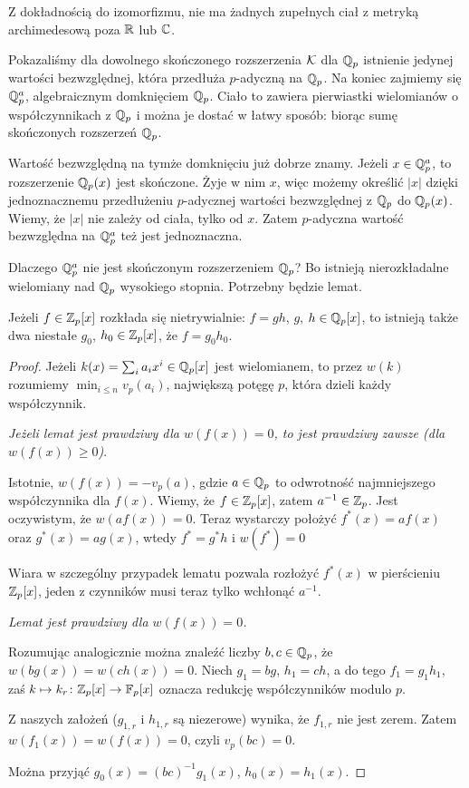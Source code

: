 \begin{fakt}
	Z dokładnością do izomorfizmu, nie ma żadnych zupełnych ciał z metryką archimedesową poza $\mathbb R$ lub $\mathbb C$.
\end{fakt}

Pokazaliśmy dla dowolnego skończonego rozszerzenia $\mathcal K$ dla $\mathbb Q_p$ istnienie jedynej wartości bezwzględnej, która przedłuża $p$-adyczną na $\mathbb Q_p$.
Na koniec zajmiemy się $\mathbb Q_p^a$, algebraicznym domknięciem $\mathbb Q_p$.
Ciało to zawiera pierwiastki wielomianów o współczynnikach z $\mathbb Q_p$ i można je dostać w łatwy sposób: biorąc sumę skończonych rozszerzeń $\mathbb Q_p$.

Wartość bezwzględną na tymże domknięciu już dobrze znamy.
Jeżeli $x \in \mathbb Q_p^a$, to rozszerzenie $\mathbb Q_p(x)$ jest skończone.
Żyje w nim $x$, więc możemy określić $|x|$ dzięki jednoznacznemu przedłużeniu $p$-adycznej wartości bezwzględnej z $\mathbb Q_p$ do $\mathbb Q_p(x)$.
Wiemy, że $|x|$ nie zależy od ciała, tylko od $x$.
Zatem $p$-adyczna wartość bezwzględna na $\mathbb Q_p^a$ też jest jednoznaczna.

Dlaczego $\mathbb Q_p^a$ nie jest skończonym rozszerzeniem $\mathbb Q_p$?
Bo istnieją nierozkładalne wielomiany nad $\mathbb Q_p$ wysokiego stopnia.
Potrzebny będzie lemat.

\begin{lemat}
	Jeżeli $f \in \mathbb Z_p[x]$ rozkłada się nietrywialnie: $f = gh$, $g$, $h \in \mathbb Q_p[x]$, to istnieją także dwa niestałe $g_0$, $h_0 \in \mathbb Z_p[x]$, że $f = g_0 h_0$.
\end{lemat}

\begin{proof}
	Jeżeli $k(x) = \sum_i a_i x^i \in \mathbb Q_p[x]$ jest wielomianem, to przez $w(k)$ rozumiemy $\min_{i \le n} v_p(a_i)$, największą potęgę $p$, która dzieli każdy współczynnik.

	\emph{Jeżeli lemat jest prawdziwy dla $w(f(x)) = 0$, to jest prawdziwy zawsze (dla $w(f(x)) \ge 0$)}.

	Istotnie, $w(f(x)) = - v_p(a)$, gdzie $a \in \mathbb Q_p$ to odwrotność najmniejszego współczynnika dla $f(x)$.
	Wiemy, że $f \in \mathbb Z_p[x]$, zatem $a^{-1} \in \mathbb Z_p$.
	Jest oczywistym, że $w(af(x)) = 0$.
	Teraz wystarczy położyć $f^*(x) = af(x)$ oraz $g^*(x) = ag(x)$, wtedy $f^* = g^*h$ i $w(f^*) =0$

	Wiara w szczególny przypadek lematu pozwala rozłożyć $f^*(x)$ w pierścieniu $\mathbb Z_p[x]$, jeden z czynników musi teraz tylko wchłonąć $a^{-1}$.

	\emph{Lemat jest prawdziwy dla $w(f(x)) = 0$.}

	Rozumując analogicznie można znaleźć liczby $b,c \in \mathbb Q_p$, że $w(bg(x)) = w(ch(x)) = 0$.
	Niech $g_1 = bg$, $h_1 = ch$, a do tego $f_1 = g_1 h_1$, zaś $k \mapsto k_r \colon \mathbb Z_p[x] \to \mathbb F_p[x]$ oznacza redukcję współczynników modulo $p$.

	Z naszych założeń ($g_{1,r}$ i $h_{1,r}$ są niezerowe) wynika, że $f_{1,r}$ nie jest zerem.
	Zatem $w(f_1(x)) = w(f(x)) = 0$, czyli $v_p(bc) = 0$.

	Można przyjąć $g_0(x) = (bc)^{-1}g_1(x)$, $h_0(x) = h_1(x)$.
\end{proof}

